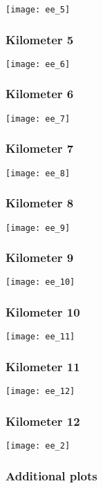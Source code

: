 \documentclass[]{article}
\begin{document}
\texttt{[image: ee\_5]}

\subsubsection{Kilometer 5}\label{kilometer-5-24}

\texttt{[image: ee\_6]}

\subsubsection{Kilometer 6}\label{kilometer-6-19}

\texttt{[image: ee\_7]}

\subsubsection{Kilometer 7}\label{kilometer-7-14}

\texttt{[image: ee\_8]}

\subsubsection{Kilometer 8}\label{kilometer-8-9}

\texttt{[image: ee\_9]}

\subsubsection{Kilometer 9}\label{kilometer-9-6}

\texttt{[image: ee\_10]}

\subsubsection{Kilometer 10}\label{kilometer-10-6}

\texttt{[image: ee\_11]}

\subsubsection{Kilometer 11}\label{kilometer-11-3}

\texttt{[image: ee\_12]}

\subsubsection{Kilometer 12}\label{kilometer-12-2}

\texttt{[image: ee\_2]}

\subsubsection{Additional plots}\label{additional-plots-30}
\end{document}
